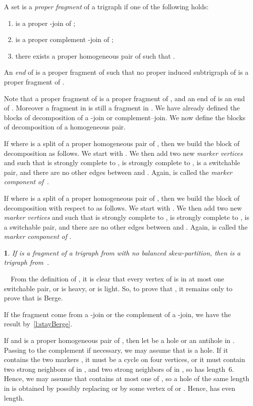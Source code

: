 \documentclass[11 pt] {article}
\newtheorem{theorem}{}[section]
\newcounter{claim}
\newcommand{\Proof}{\setcounter{claim}{0}\noindent{\bf Proof.}\ \ }
\begin{document}
A set  is a \emph{proper fragment} of a trigraph  if
one of the following holds:
\begin{enumerate}
\item\label{i:2J}  is a proper -join of ;
\item\label{i:C2J}  is a proper complement -join of ;
\item\label{i:HP} there exists a proper homogeneous pair  of  such that
.
\end{enumerate}


An \emph{end} of  is a proper fragment  of  such that no
proper induced subtrigraph of  is a proper fragment of .

Note that a proper fragment of  is a proper fragment of
, and an end of  is an end of
. Moreover a fragment in  is still a fragment in
. We have already defined the blocks of decomposition of
a -join or complement--join.  We now define the blocks of
decomposition of a homogeneous pair.

If  where  is a split of a proper
homogeneous pair  of , then we build the block of
decomposition as follows. We start with . We then add
two new \emph{marker vertices}  and  such that  is strongly
complete to ,  is strongly complete to ,  is a
switchable pair, and there are no other edges between  and .  Again,  is called the \emph{marker component of~}.



If  where  is a
split of a proper homogeneous pair  of , then we build the
block of decomposition  with respect to  as follows. We
start with . We then add two new \emph{marker vertices}  and
 such that  is strongly complete to ,  is strongly
complete to ,  is a switchable pair, and there are no
other edges between  and .  Again,
 is called the \emph{marker component of }.

\begin{theorem}
 \label{l:stayBergeExt}
 If  is a fragment of a trigraph  from  with no
 balanced skew-partition, then  is a trigraph from~.
\end{theorem}

\Proof From the definition of , it is clear that every vertex of
 is in at most one switchable pair, or is heavy, or is light.
So, to prove that , it remains only to prove
that  is Berge.

If the fragment come from a -join or the complement of a -join,
we have the result by~\ref{l:stayBerge}.

If  and  is a proper homogeneous pair of ,
then let  be a hole or an antihole in . Passing to the
complement if necessary, we may assume that  is a hole. If it
contains the two markers , it must be a cycle on four vertices,
or it must contain two strong neighbors of  in , and two strong
neighbors of  in , so  has length~6. Hence, we may assume
that  contains at most one of , so a hole of the same length
in  is obtained by possibly replacing  or  by some vertex of
 or . Hence,  has even length.
\end{document}
